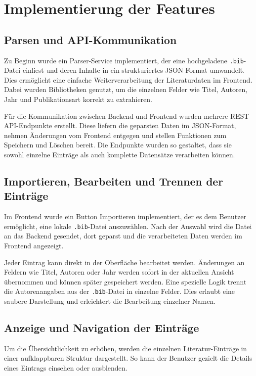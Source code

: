 \section{Implementierung der Features}

\subsection{Parsen und API-Kommunikation}
Zu Beginn wurde ein Parser-Service implementiert, der eine hochgeladene \texttt{.bib}-Datei einliest 
und deren Inhalte in ein strukturiertes JSON-Format umwandelt. Dies ermöglicht eine einfache Weiterverarbeitung 
der Literaturdaten im Frontend. Dabei wurden Bibliotheken genutzt, um die einzelnen Felder wie Titel, Autoren, Jahr
und Publikationsart korrekt zu extrahieren.

Für die Kommunikation zwischen Backend und Frontend wurden mehrere REST-API-Endpunkte erstellt.
Diese liefern die geparsten Daten im JSON-Format, nehmen Änderungen vom Frontend entgegen und
stellen Funktionen zum Speichern und Löschen bereit. Die Endpunkte wurden so gestaltet, dass sie sowohl
einzelne Einträge als auch komplette Datensätze verarbeiten können.

\subsection{Importieren, Bearbeiten und Trennen der Einträge}
Im Frontend wurde ein Button \glqq Importieren\grqq{} implementiert, der es dem Benutzer ermöglicht,
eine lokale \texttt{.bib}-Datei auszuwählen. Nach der Auswahl wird die Datei an das Backend gesendet, 
dort geparst und die verarbeiteten Daten werden im Frontend angezeigt.

Jeder Eintrag kann direkt in der Oberfläche bearbeitet werden. Änderungen an Feldern wie Titel,
Autoren oder Jahr werden sofort in der aktuellen Ansicht übernommen und können später gespeichert werden.
Eine spezielle Logik trennt die Autorenangaben aus der \texttt{.bib}-Datei in einzelne Felder.
Dies erlaubt eine saubere Darstellung und erleichtert die Bearbeitung einzelner Namen.

\subsection{Anzeige und Navigation der Einträge}
Um die Übersichtlichkeit zu erhöhen, werden die einzelnen Literatur-Einträge in einer aufklappbaren
Struktur dargestellt. So kann der Benutzer gezielt die Details eines Eintrags einsehen oder ausblenden.

